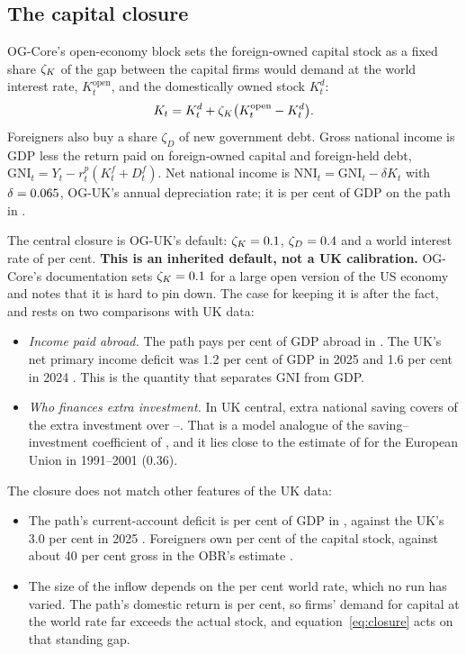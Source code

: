 \subsection{The capital closure}
\label{sec:closure}

OG-Core's open-economy block sets the foreign-owned capital stock as a fixed share $\zeta_K$ of the gap between the capital firms would demand at the world interest rate, $K^{\text{open}}_t$, and the domestically owned stock $K^d_t$:
\begin{equation}
\label{eq:closure}
K_t = K^d_t + \zeta_K \bigl(K^{\text{open}}_t - K^d_t\bigr).
\end{equation}
Foreigners also buy a share $\zeta_D$ of new government debt. Gross national income is GDP less the return paid on foreign-owned capital and foreign-held debt, $\text{GNI}_t = Y_t - r^p_t (K^f_t + D^f_t)$. Net national income is $\text{NNI}_t = \text{GNI}_t - \delta K_t$ with $\delta = 0.065{}$, OG-UK's annual depreciation rate; it is \genNniGdpBaseCentral{} per cent of GDP on the path in \genHeadYear{}.

The central closure is OG-UK's default: $\zeta_K = 0.1{}$, $\zeta_D = 0.4{}$ and a world interest rate of \genWorldRatePct{} per cent. \textbf{This is an inherited default, not a UK calibration.} OG-Core's documentation sets $\zeta_K = 0.1$ for a large open version of the US economy and notes that it is hard to pin down. The case for keeping it is after the fact, and rests on two comparisons with UK data:
\begin{itemize}
\item \emph{Income paid abroad.} The path pays \genPaidAbroadBaseCentral{} per cent of GDP abroad in \genHeadYear{}. The UK's net primary income deficit was 1.2 per cent of GDP in 2025 and 1.6 per cent in 2024 \citep{ons2026pinkbook}. This is the quantity that separates GNI from GDP.
\item \emph{Who finances extra investment.} In UK central, extra national saving covers \genUkCentralSavingShareCentral{} of the extra investment over \genShockYear--\genHeadYear{}. That is a model analogue of the saving--investment coefficient of \citet{feldsteinhorioka1980}, and it lies close to the estimate of \citet[Table~3]{blanchardgiavazzi2002} for the European Union in 1991--2001 (0.36).
\end{itemize}
The closure does not match other features of the UK data:
\begin{itemize}
\item The path's current-account deficit is \genCurrentAccountDeficitBaseCentral{} per cent of GDP in \genHeadYear{}, against the UK's 3.0 per cent in 2025 \citep{ons2026pinkbook}. Foreigners own \genForeignOwnedCapitalBaseCentral{} per cent of the capital stock, against about 40 per cent gross in the OBR's estimate \citep{obr2025wp22}.
\item The size of the inflow depends on the \genWorldRatePct{} per cent world rate, which no run has varied. The path's domestic return is \genBaseInterestPctCentral{} per cent, so firms' demand for capital at the world rate far exceeds the actual stock, and equation~\eqref{eq:closure} acts on that standing gap.
\end{itemize}

